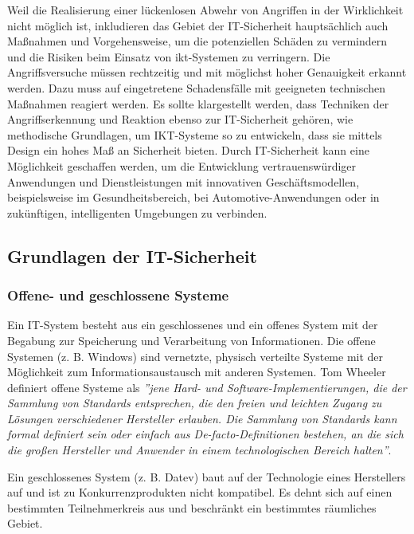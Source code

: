 Weil die Realisierung einer lückenlosen Abwehr von Angriffen in der Wirklichkeit nicht möglich ist, inkludieren das Gebiet der IT-Sicherheit hauptsächlich auch Maßnahmen und Vorgehensweise, um die potenziellen Schäden zu vermindern und die Risiken beim Einsatz von \gls{ikt}-Systemen zu verringern. Die Angriffsversuche müssen rechtzeitig und mit möglichst hoher Genauigkeit erkannt werden. Dazu muss auf eingetretene Schadensfälle mit geeigneten technischen Maßnahmen reagiert werden. Es sollte klargestellt werden, dass Techniken der Angriffserkennung und Reaktion ebenso zur IT-Sicherheit gehören, wie methodische Grundlagen, um IKT-Systeme so zu entwickeln, dass sie mittels Design ein hohes Maß an Sicherheit bieten. Durch IT-Sicherheit kann eine Möglichkeit geschaffen werden, um die Entwicklung vertrauenswürdiger Anwendungen und Dienstleistungen mit innovativen Geschäftsmodellen, beispielsweise im Gesundheitsbereich, bei Automotive-Anwendungen oder in zukünftigen, intelligenten Umgebungen zu verbinden\cite[20--21]{eckert2013sicherheit}.

\subsection{Grundlagen der IT-Sicherheit}

\subsubsection{Offene- und geschlossene Systeme}

Ein IT-System besteht aus ein geschlossenes und ein offenes System mit der Begabung zur Speicherung und Verarbeitung von Informationen. Die offene Systemen (z. B. Windows) sind vernetzte, physisch verteilte Systeme mit der Möglichkeit zum Informationsaustausch mit anderen Systemen\cite[22--23]{eckert2013sicherheit}. Tom Wheeler definiert offene Systeme als \emph{''jene Hard- und Software-Implementierungen, die der Sammlung von Standards entsprechen, die den freien und leichten Zugang zu Lösungen verschiedener Hersteller erlauben. Die Sammlung von Standards kann formal definiert sein oder einfach aus De-facto-Definitionen bestehen, an die sich die großen Hersteller und Anwender in einem technologischen Bereich halten''}\cite[4]{wheeler2013offene}. 

Ein geschlossenes System (z. B. Datev) baut auf der Technologie eines Herstellers auf und ist zu Konkurrenzprodukten nicht kompatibel.  Es dehnt sich auf einen bestimmten Teilnehmerkreis aus und beschränkt ein bestimmtes räumliches Gebiet\cite[22--23]{eckert2013sicherheit}.

